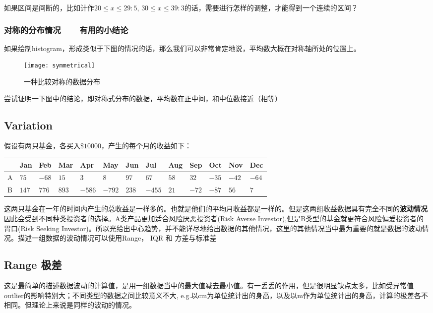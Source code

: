 \begin{TaskBox}
如果区间是间断的，比如计作$20\leqslant x \leqslant 29:5$, $30\leqslant x \leqslant 39:3$的话，需要进行怎样的调整，才能得到一个连续的区间？
\end{TaskBox}

\subsubsection*{对称的分布情况——有用的小结论}
如果绘制histogram，形成类似于下图的情况的话，那么我们可以非常肯定地说，平均数大概在对称轴所处的位置上。
\begin{figure}[H]
\centering
\texttt{[image: symmetrical]}
\caption{一种比较对称的数据分布}
\end{figure}

\begin{TaskBox}
尝试证明一下图中的结论，即对称式分布的数据，平均数在正中间，和中位数接近（相等）
\end{TaskBox}

\subsection*{Variation}
假设有两只基金，各买入$\$ 10000$，产生的每个月的收益如下：
\begin{table}[H]
\centering
\begin{tabular}{|l|l|l|l|l|l|l|l|l|l|l|l|l|}
\hline
  & Jan & Feb & Mar & Apr  & May  & Jun & Jul  & Aug & Sep & Oct & Nov & Dec \\ \hline
A & $75$  & $-68$ & $15$  & $3$    & $8$    & $97$  & $67$   & $58$  & $32$  & $-35$ & $-42$ & $-64$ \\ \hline
B & $147$   & $776$ & $893$ & $-586$ & $-792$ & $238$ & $-455$ & $21$  & $-72$ & $-87$ & $56$  & $7$ \\ \hline
\end{tabular}
\end{table}
这两只基金在一年的时间内产生的总收益是一样多的。也就是他们的平均月收益都是一样的。但是这两组收益数据具有完全不同的\textbf{波动情况}因此会受到不同种类投资者的选择。A类产品更加适合风险厌恶投资者(Risk Averse Investor),但是B类型的基金就更符合风险偏爱投资者的胃口(Risk Seeking Investor)。所以光给出中心趋势，并不能详尽地给出数据的其他情况，这里的其他情况当中最为重要的就是数据的波动情况。描述一组数据的波动情况可以使用Range， IQR 和 方差与标准差

\subsection*{Range 极差}
这是最简单的描述数据波动的计算值，是用一组数据当中的最大值减去最小值。有一丢丢的作用，但是很明显缺点太多，比如受异常值outlier的影响特别大；不同类型的数据之间比较意义不大, e.g.以\si{cm}为单位统计出的身高，以及以\si{m}作为单位统计出的身高，计算的极差各不相同。但理论上来说是同样的波动的情况。

